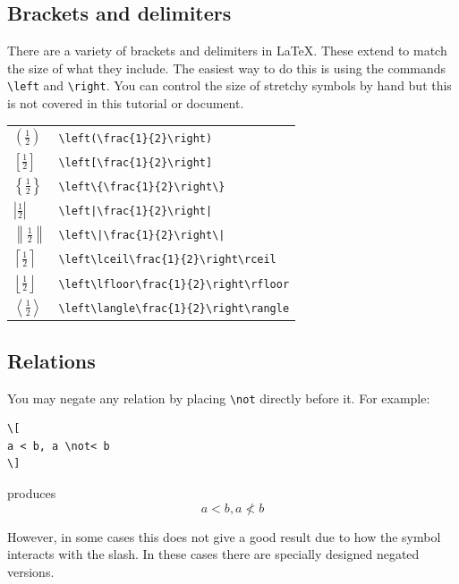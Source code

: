 \documentclass[a4paper,14pt]{extarticle}
\begin{document}
\subsection{Brackets and delimiters}
There are a variety of brackets and delimiters in \LaTeX. These extend to match the size of what they include. The easiest way to do this is using the commands \verb=\left= and \verb=\right=. You can control the size of stretchy symbols by hand but this is not covered in this tutorial or document.

\begin{center}
\renewcommand{\arraystretch}{3.0}
\begin{tabular}
{|p{}p{}|}
\hline
\(\displaystyle\left(\frac{1}{2}\right)\) & \verb=\left(\frac{1}{2}\right)= \\  
\(\displaystyle\left[\frac{1}{2}\right]\) & \verb=\left[\frac{1}{2}\right]= \\ 
\(\displaystyle\left\{\frac{1}{2}\right\}\) & \verb=\left\{\frac{1}{2}\right\}= \\  
\(\displaystyle\left|\frac{1}{2}\right|\) & \verb=\left|\frac{1}{2}\right|= \\  
\(\displaystyle\left\|\frac{1}{2}\right\|\) & \verb=\left\|\frac{1}{2}\right\|= \\  
\(\displaystyle\left\lceil \frac{1}{2}\right\rceil\) & \verb=\left\lceil\frac{1}{2}\right\rceil= \\  
\(\displaystyle\left\lfloor \frac{1}{2}\right\rfloor\) & \verb=\left\lfloor\frac{1}{2}\right\rfloor= \\
\(\displaystyle\left\langle \frac{1}{2} \right\rangle\) & \verb=\left\langle\frac{1}{2}\right\rangle= \\ 
\hline
\end{tabular}
\end{center}

\subsection{Relations}

You may negate any relation by placing \verb=\not= directly before it. For example:
\begin{verbatim}
\[
a < b, a \not< b
\]
\end{verbatim}
produces
\[
a < b, a \not< b
\]

However, in some cases this does not give a good result due to how the symbol interacts with the slash. In these cases there are specially designed negated versions. 
\end{document}
